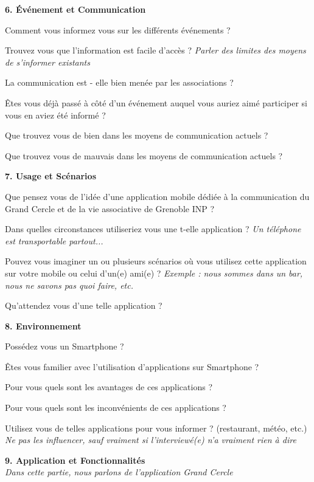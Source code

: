 \documentclass[a4paper, 11px]{article}
\begin{document}
 \textbf {\large 6. Événement et Communication}

Comment vous informez vous sur les différents événements ?

Trouvez vous que l'information est facile d'accès ?
\textit{Parler des limites des moyens de s'informer existants}


La communication est - elle bien menée par les associations ?

Êtes vous déjà passé à côté d'un événement auquel vous auriez aimé participer si vous en aviez été informé ?

Que trouvez vous de bien dans les moyens de communication actuels ?


Que trouvez vous de mauvais dans les moyens de communication actuels ?


\vspace{.3cm}

 \textbf {\large 7. Usage et Scénarios}

Que pensez vous de l'idée d'une application mobile dédiée à la communication du Grand Cercle et de la vie associative de Grenoble INP ?


Dans quelles circonstances utiliseriez vous une t-elle application ?
\textit{Un téléphone est transportable partout...}


Pouvez vous imaginer un ou plusieurs scénarios où vous utilisez cette application sur votre mobile ou celui d'un(e) ami(e) ?
\textit{Exemple : nous sommes dans un bar, nous ne savons pas quoi faire, etc.}

Qu'attendez vous d'une telle application ?


\vspace{.3cm}

 \textbf {\large 8. Environnement}

Possédez vous un Smartphone ?

Êtes vous familier avec l'utilisation d'applications sur Smartphone ?

Pour vous quels sont les avantages de ces applications ?

Pour vous quels sont les inconvénients de ces applications ?

Utilisez vous de telles applications pour vous informer ? (restaurant, météo, etc.)
\textit {Ne pas les influencer, sauf vraiment si l'interviewé(e) n'a vraiment rien à dire}


\vspace{.3cm}

 \textbf {\large 9. Application et Fonctionnalités}\\
\textit{Dans cette partie, nous parlons de l'application Grand Cercle}
\end{document}
